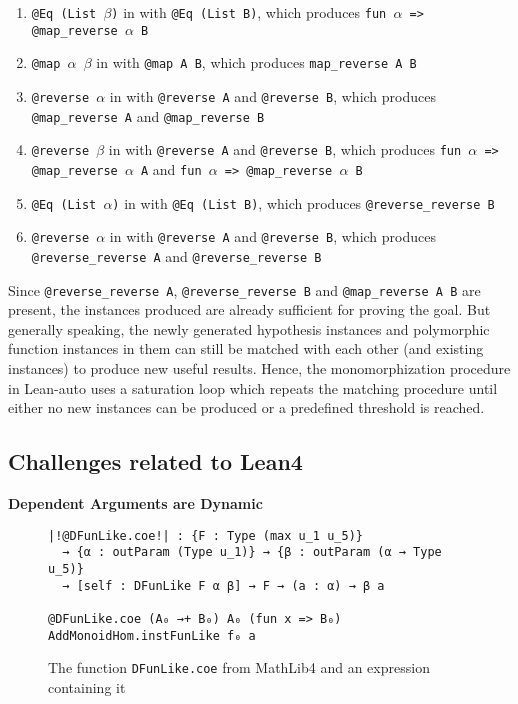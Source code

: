 \begin{enumerate}
  \item \texttt{@Eq (List $\beta$)} in \usebox{\vmaprev} with \texttt{@Eq (List B)},
    which produces \texttt{fun $\alpha$ => @map\_reverse $\alpha$ B}
  \item \texttt{@map $\alpha$ $\beta$} in \usebox{\vmaprev} with \texttt{@map A B},
    which produces \texttt{map\_reverse A B}
  \item \texttt{@reverse $\alpha$} in \usebox{\vmaprev} with \texttt{@reverse A} and \texttt{@reverse B},
    which produces \texttt{@map\_reverse A} and \texttt{@map\_reverse B}
  \item \texttt{@reverse $\beta$} in \usebox{\vmaprev} with \texttt{@reverse A} and \texttt{@reverse B},
    which produces \texttt{fun $\alpha$ => @map\_reverse $\alpha$ A} and \texttt{fun $\alpha$ => @map\_reverse $\alpha$ B}
  \item \texttt{@Eq (List $\alpha$)} in \usebox{\vrevrev} with \texttt{@Eq (List B)},
    which produces \texttt{@reverse\_reverse B}
  \item \texttt{@reverse $\alpha$} in \usebox{\vrevrev} with \texttt{@reverse A} and \texttt{@reverse B},
    which produces \texttt{@reverse\_reverse A} and \texttt{@reverse\_reverse B}
\end{enumerate}

Since \texttt{@reverse\_reverse A}, \texttt{@reverse\_reverse B} and \texttt{@map\_reverse A B}
are present, the instances produced are already sufficient for proving the goal.
But generally speaking, the newly generated hypothesis instances and polymorphic function instances
in them can still be matched with each other (and existing instances) to produce new useful results.
Hence, the monomorphization procedure in Lean-auto uses a saturation loop which
repeats the matching procedure until either no new instances can be produced or a predefined
threshold is reached.

\subsection{Challenges related to Lean4} \label{exqdet}

\noindent \textbf{Dependent Arguments are Dynamic}

\begin{figure}
  \begin{CenteredBox}
    \begin{lstlisting}[style=leanHH]
|!@DFunLike.coe!| : {F : Type (max u_1 u_5)}
  → {α : outParam (Type u_1)} → {β : outParam (α → Type u_5)}
  → [self : DFunLike F α β] → F → (a : α) → β a

@DFunLike.coe (A₀ →+ B₀) A₀ (fun x => B₀) AddMonoidHom.instFunLike f₀ a 
    \end{lstlisting}
  \end{CenteredBox}
  \caption{The function \texttt{DFunLike.coe} from MathLib4 and an expression
  containing it}
  \label{dfun}
\end{figure}

